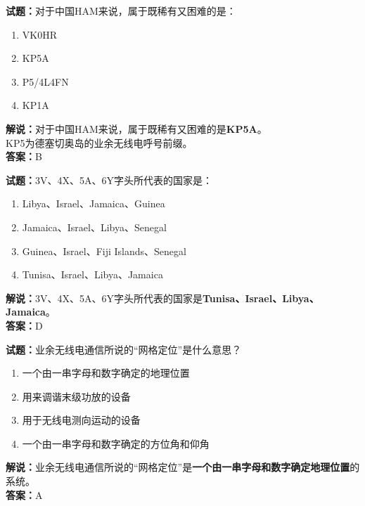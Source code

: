 \documentclass{ctexbook}
\begin{document}
\noindent\textbf{试题：}对于中国HAM来说，属于既稀有又困难的是：
\begin{enumerate}[leftmargin=3em]
	\item VK0HR
	\item KP5A
	\item P5/4L4FN%
	\item KP1A
\end{enumerate}
\noindent\textbf{解说：}对于中国HAM来说，属于既稀有又困难的是\textbf{KP5A}。\\KP5为德塞切奥岛的业余无线电呼号前缀。\\\noindent\textbf{答案：}B

\bigskip


\noindent\textbf{试题：}3V、4X、5A、6Y字头所代表的国家是：
\begin{enumerate}[leftmargin=3em]
	\item Libya、Israel、Jamaica、Guinea
	\item Jamaica、Israel、Libya、Senegal
	\item Guinea、Israel、Fiji Islands、Senegal
	\item Tunisa、Israel、Libya、Jamaica%
\end{enumerate}
\noindent\textbf{解说：}3V、4X、5A、6Y字头所代表的国家是\textbf{Tunisa、Israel、Libya、Jamaica}。\\\noindent\textbf{答案：}D

\bigskip


\noindent\textbf{试题：}业余无线电通信所说的“网格定位”是什么意思？
\begin{enumerate}[leftmargin=3em]
	\item 一个由一串字母和数字确定的地理位置
	\item 用来调谐末级功放的设备
	\item 用于无线电测向运动的设备
	\item 一个由一串字母和数字确定的方位角和仰角
\end{enumerate}
\noindent\textbf{解说：}业余无线电通信所说的“网格定位”是\textbf{一个由一串字母和数字确定地理位置}的系统。\\\noindent\textbf{答案：}A




\end{document}
